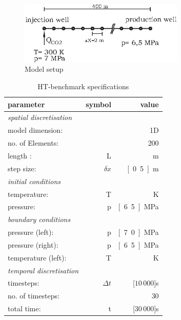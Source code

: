 \begin{figure}[ht]
\centering
\includegraphics[width=0.7\textwidth]{FLUID_PROPERTIES/figures/Modelsetup-nlgwft.eps}
\caption{Model setup}
\label{fig-eos-ms-bt2}
\end{figure}


\begin{table}%
\caption{HT-benchmark specifications}
\label{eos-co2-flow-mod-spec} 
\begin{center}
\begin{tabular}{lrr}
\toprule
\textbf{parameter}   			& \textbf{symbol} 	& \textbf{value} \\
\midrule
\textit{spatial discretisation} &  					&  \\
model dimension:     			&	            	& 1D               \\
no. of Elements:    			&              		& 200              \\
length :             			& L            		& \unit[100]{m} \\ 
step size:           			& $\delta x$   		& \unit[0.5]{m} \\
\midrule
\textit{initial conditions} 	& 					& \\
temperature:         			& T            		& \unit[400]{K} \\
pressure:            			& p            		& \unit[6.5]{MPa} \\
\midrule
\textit{boundary conditions} 	& 					& \\
pressure (left):     			& p            		& \unit[7.0]{MPa} \\
pressure (right):    			& p            		& \unit[6.5]{MPa} \\
temperature (left):  			& T            		& \unit[300]{K} \\
\midrule
\textit{temporal discretisation} & 					& \\
timesteps:           			& $\Delta t$   		& \unit[$10\,000$]{s}  \\ 
no. of timesteps:    			&              		& 30    \\
total time:          			&     t        		& \unit[$30\,000$]{s}  \\


\end{tabular}
\end{center}
\end{table}
